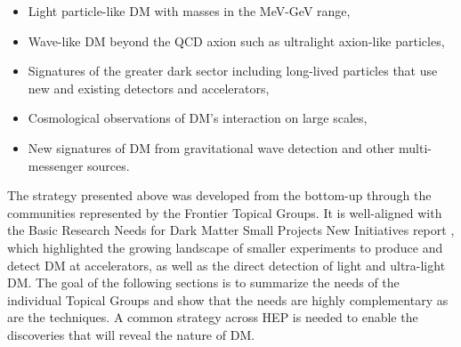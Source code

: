 \documentclass[nofootinbib]{article}
\begin{document}


\begin{itemize}[leftmargin=1.0em, noitemsep]
\item Light particle-like DM with masses in the MeV-GeV range,
\item Wave-like DM beyond the QCD axion such as ultralight axion-like particles,
\item Signatures of the greater dark sector including long-lived particles that use new and existing detectors and accelerators,
\item Cosmological observations of DM's interaction on large scales,
\item New signatures of DM from gravitational wave detection and other multi-messenger sources. 
\end{itemize}

The strategy presented above was developed from the bottom-up through the communities represented by the Frontier Topical Groups. It is well-aligned with the Basic Research Needs for Dark Matter Small Projects New Initiatives report \cite{BRNreport}, which highlighted the growing landscape of smaller experiments to produce and detect DM at accelerators, as well as the direct detection of light and ultra-light DM. The goal of the following sections is to summarize the needs of the individual Topical Groups and show that the needs are highly complementary as are the techniques. A common strategy across HEP is needed to enable the discoveries that will reveal the nature of DM.


\end{document}
